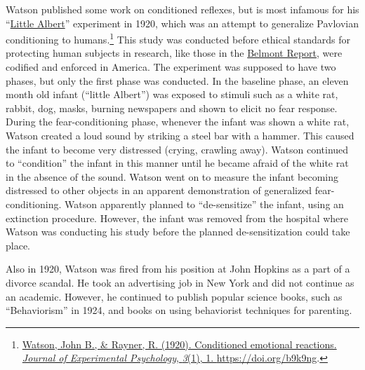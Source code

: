 \documentclass[
  oneside,
  12pt]{crumpbook}
\begin{document}
Watson published some work on conditioned reflexes, but is most infamous for his ``\href{https://en.wikipedia.org/wiki/Little_Albert_experiment}{Little Albert}'' experiment in 1920, which was an attempt to generalize Pavlovian conditioning to humans.\footnote{\protect\hyperlink{ref-watsonConditionedEmotionalReactions1920}{Watson, John B., \& Rayner, R. (1920). Conditioned emotional reactions. \emph{Journal of Experimental Psychology}, \emph{3}(1), 1. \url{https://doi.org/b9k9ng}}.} This study was conducted before ethical standards for protecting human subjects in research, like those in the \href{https://en.wikipedia.org/wiki/Belmont_Report}{Belmont Report}, were codified and enforced in America. The experiment was supposed to have two phases, but only the first phase was conducted. In the baseline phase, an eleven month old infant (``little Albert'') was exposed to stimuli such as a white rat, rabbit, dog, masks, burning newspapers and shown to elicit no fear response. During the fear-conditioning phase, whenever the infant was shown a white rat, Watson created a loud sound by striking a steel bar with a hammer. This caused the infant to become very distressed (crying, crawling away). Watson continued to ``condition'' the infant in this manner until he became afraid of the white rat in the absence of the sound. Watson went on to measure the infant becoming distressed to other objects in an apparent demonstration of generalized fear-conditioning. Watson apparently planned to ``de-sensitize'' the infant, using an extinction procedure. However, the infant was removed from the hospital where Watson was conducting his study before the planned de-sensitization could take place.

Also in 1920, Watson was fired from his position at John Hopkins as a part of a divorce scandal. He took an advertising job in New York and did not continue as an academic. However, he continued to publish popular science books, such as ``Behaviorism'' in 1924, and books on using behaviorist techniques for parenting.
\end{document}
